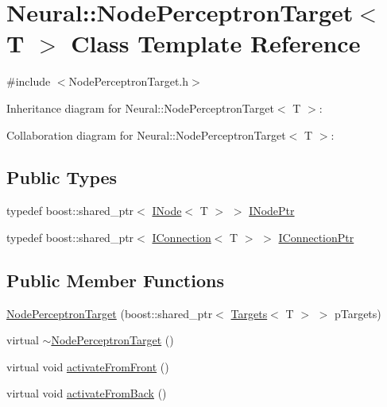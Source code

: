 \hypertarget{class_neural_1_1_node_perceptron_target}{
\section{Neural::NodePerceptronTarget$<$ T $>$ Class Template Reference}
\label{class_neural_1_1_node_perceptron_target}
}


{\ttfamily \#include $<$NodePerceptronTarget.h$>$}



Inheritance diagram for Neural::NodePerceptronTarget$<$ T $>$:


Collaboration diagram for Neural::NodePerceptronTarget$<$ T $>$:
\subsection*{Public Types}
\begin{DoxyCompactItemize}
\item 
typedef boost::shared\_\-ptr$<$ \hyperlink{class_neural_1_1_i_node}{INode}$<$ T $>$ $>$ \hyperlink{class_neural_1_1_node_perceptron_target_a316ef324c33542e485285f5733876ed2}{INodePtr}
\item 
typedef boost::shared\_\-ptr$<$ \hyperlink{class_neural_1_1_i_connection}{IConnection}$<$ T $>$ $>$ \hyperlink{class_neural_1_1_node_perceptron_target_abdb5cb819de661fc83edb4eceb81f7e8}{IConnectionPtr}
\end{DoxyCompactItemize}
\subsection*{Public Member Functions}
\begin{DoxyCompactItemize}
\item 
\hyperlink{class_neural_1_1_node_perceptron_target_a4e73cc53014b401585da5eef7ecde101}{NodePerceptronTarget} (boost::shared\_\-ptr$<$ \hyperlink{class_neural_1_1_targets}{Targets}$<$ T $>$ $>$ pTargets)
\item 
virtual \hyperlink{class_neural_1_1_node_perceptron_target_aec843aab4a4511db78c9e4de2593f0e1}{$\sim$NodePerceptronTarget} ()
\item 
virtual void \hyperlink{class_neural_1_1_node_perceptron_target_a64d68059836b16229a14c7ed4028c084}{activateFromFront} ()
\item 
virtual void \hyperlink{class_neural_1_1_node_perceptron_target_a65c3f0c315fa41144468729b19371ee8}{activateFromBack} ()
\end{DoxyCompactItemize}
